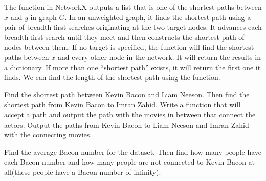 The  function in NetworkX outputs a list that is one of the shortest paths between $x$ and $y$ in graph $G$.  In an unweighted graph, it finds the shortest path using a pair of breadth first searches originating at the two target nodes.  It advances each breadth first search until they meet and then  constructs the shortest path of nodes between them.  If no target is specified, the function will find the shortest paths between $x$ and every other node in the network.  It will return the results in a dictionary.  If more than one ``shortest path'' exists, it will return the first one it finds.  We can find the length of the shortest path using the  function.

\begin{problem}
Find the shortest path between Kevin Bacon and Liam Neeson. Then find the shortest path from Kevin Bacon to Imran Zahid. Write a function that will accept a path and output the path with the movies in between that connect the actors. Output the paths from Kevin Bacon to Liam Neeson and Imran Zahid with the connecting movies.
\end{problem}

\begin{problem}
Find the average Bacon number for the dataset. Then find how many people have each Bacon number and how many people are not connected to Kevin Bacon at all(these people have a Bacon number of infinity).
\end{problem}

